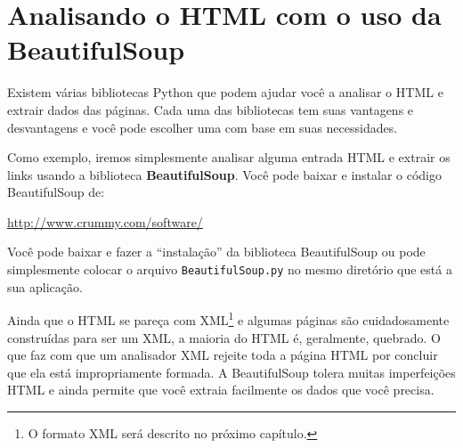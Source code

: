 \section{Analisando o HTML com o uso da BeautifulSoup}

Existem várias bibliotecas Python que podem ajudar você a analisar o HTML e
extrair dados das páginas. Cada uma das bibliotecas tem suas vantagens e
desvantagens e você pode escolher uma com base em suas necessidades.

Como exemplo, iremos simplesmente analisar alguma entrada HTML e extrair os
links usando a biblioteca {\bf BeautifulSoup}. Você pode baixar e instalar o
código BeautifulSoup de:

\url{http://www.crummy.com/software/}

Você pode baixar e fazer a ``instalação'' da biblioteca BeautifulSoup ou pode
simplesmente colocar o arquivo {\tt BeautifulSoup.py} no mesmo diretório que
está a sua aplicação.

Ainda que o HTML se pareça com XML\footnote{O formato XML será descrito no
próximo capítulo.} e algumas páginas são cuidadosamente construídas para ser
um XML, a maioria do HTML é, geralmente, quebrado. O que faz com que um
analisador XML rejeite toda a página HTML por concluir que ela está
impropriamente formada. A BeautifulSoup tolera muitas imperfeições HTML e
ainda permite que você extraia facilmente os dados que você precisa.

